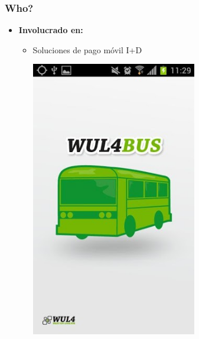 \frame
{
\frametitle{Who?}
\begin{itemize}
\item \textbf{Involucrado en:} 
  \begin{itemize}
    \item Soluciones de pago móvil I+D
      \begin{center}
	\includegraphics[width=0.6\textwidth]{imgs/wul4bus.jpg}
      \end{center}
  \end{itemize}
\end{itemize}
}

